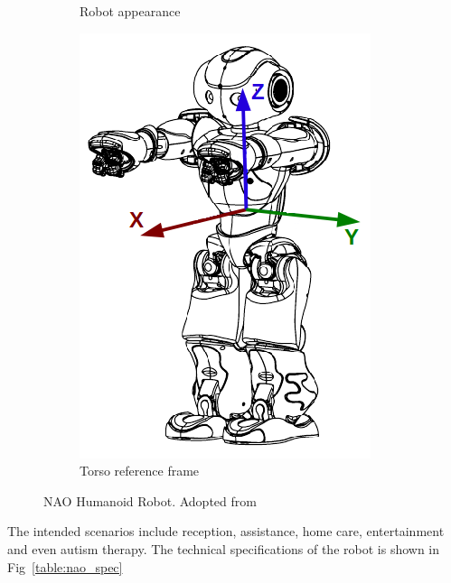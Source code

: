 \begin{figure}[H]
\begin{subfigure}[b]{0.25\textwidth}
\caption{Robot appearance}
\label{fig:naojoint}
\end{subfigure}
\begin{subfigure}[b]{0.25\textwidth}
\includegraphics[width=\textwidth]{assets/hardware_inertialunit1.png}
\caption{Torso reference frame}
\label{fig:naoreference}
\end{subfigure}
\caption[NAO Humanoid Robot]{NAO Humanoid Robot. {Adopted from \cite{NaoTheRobot}}}
\label{fig:naorobot}
\end{figure}%
The intended scenarios include reception, assistance, home care, entertainment and even autism therapy. The technical specifications of the robot is shown in Fig~\ref{table:nao_spec}
